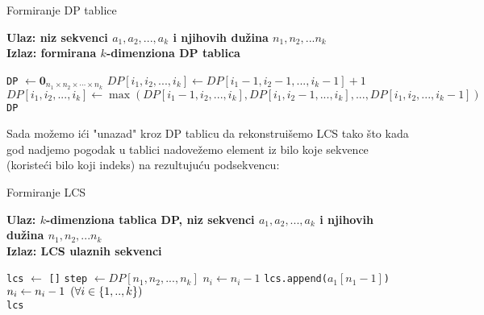 \documentclass{article}
\begin{document}
    \begin{algorithm}
        \caption{Formiranje DP tablice}
        \hspace*{\algorithmicindent} \textbf{Ulaz: niz sekvenci $a_1,a_2,...,a_k$ i njihovih dužina $n_1, n_2,...n_k$} \\
        \hspace*{\algorithmicindent} \textbf{Izlaz: formirana $k$-dimenziona DP tablica}
        \begin{algorithmic}
            \State \texttt{DP} $\gets \mathbf{0}_{n_1 \times n_2 \times \cdots \times n_k}$
                    \State $DP[i_1, i_2, ... , i_k] \gets DP[i_1-1, i_2-1, ... , i_k-1] + 1$
                \Else
                    \State $DP[i_1, i_2, ... , i_k] \gets \max{(DP[i_1-1, i_2, ... , i_k], DP[i_1, i_2-1, ... , i_k], ..., DP[i_1, i_2, ... , i_k-1])}$
                \EndIf
            \EndFor \\
            \Return \texttt{DP}
        \end{algorithmic}
    \end{algorithm}

    Sada možemo ići "unazad" kroz DP tablicu da rekonstruišemo LCS tako što kada god nadjemo pogodak u tablici nadovežemo element iz bilo koje sekvence (koristeći bilo koji indeks) na rezultujuću podsekvencu:

    \begin{algorithm}
        \caption{Formiranje LCS}
        \hspace*{\algorithmicindent} \textbf{Ulaz: $k$-dimenziona tablica DP, niz sekvenci $a_1,a_2,...,a_k$ i njihovih dužina $n_1, n_2,...n_k$} \\
        \hspace*{\algorithmicindent} \textbf{Izlaz: LCS ulaznih sekvenci}
        \begin{algorithmic}
            \State \texttt{lcs} $\gets$ \texttt{[]}
                \State \texttt{step} $\gets DP[n_1, n_2, ..., n_k]$
                    \State $n_i \gets n_i-1$
                \Else
                    \State \texttt{lcs.append($a_1[n_1 - 1]$)}
                    \State $n_i \gets n_i - 1  \hspace{0.5em} (\forall i \in \{1,..,k\})$
                \EndIf
            \EndWhile \\
            \Return \texttt{lcs}
        \end{algorithmic}
    \end{algorithm}
\end{document}
